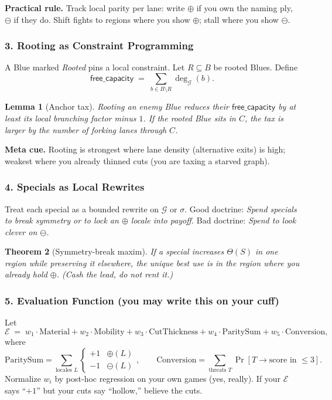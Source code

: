\documentclass[11pt]{article}
\numberwithin{equation}{section} %
\theoremstyle{plain} %
\newtheorem{theorem}{Theorem}[section]
\newtheorem{lemma}[theorem]{Lemma}
\theoremstyle{definition} %
\theoremstyle{remark} %
\begin{document}
\noindent\textbf{Practical rule.} Track local parity per lane: write \(\oplus\) if you own the naming ply, \(\ominus\) if they do. Shift fights to regions where you show \(\oplus\); stall where you show \(\ominus\).

\subsubsection{3. Rooting as Constraint Programming}
\label{ael-core:root}
A Blue marked \emph{Rooted} pins a local constraint. Let \(R\subseteq B\) be rooted Blues. Define
\[
\mathsf{free\_capacity} \;=\; \sum_{b\in B\setminus R}\deg_{\mathcal{G}}(b).
\]

\begin{lemma}[Anchor tax]
Rooting an enemy Blue reduces their \(\mathsf{free\_capacity}\) by at least its local branching factor minus \(1\). If the rooted Blue sits in \(C\), the tax is larger by the number of forking lanes through \(C\).
\end{lemma}

\noindent\textbf{Meta cue.} Rooting is strongest where lane density (alternative exits) is high; weakest where you already thinned cuts (you are taxing a starved graph).

\subsubsection{4. Specials as Local Rewrites}
\label{ael-core:specials}
Treat each special as a bounded rewrite on \(\mathcal{G}\) or \(\sigma\). Good doctrine: \emph{Spend specials to break symmetry or to lock an \(\oplus\) locale into payoff.} Bad doctrine: \emph{Spend to look clever on \(\ominus\).}

\begin{theorem}[Symmetry-break maxim]
If a special increases \(\Theta(S)\) in one region while preserving it elsewhere, the unique best use is in the region where you already hold \(\oplus\). (Cash the lead, do not rent it.)
\end{theorem}

\subsubsection{5. Evaluation Function (you may write this on your cuff)}
Let
\[
\mathcal{E} \;=\; w_1 \cdot \mathrm{Material} + w_2 \cdot \mathrm{Mobility} + w_3 \cdot \mathrm{CutThickness} + w_4 \cdot \mathrm{ParitySum} + w_5 \cdot \mathrm{Conversion},
\]
where
\[
\mathrm{ParitySum}=\sum_{\text{locales }L} \begin{cases}+1 & \oplus(L)\\ -1 & \ominus(L)\end{cases},
\qquad
\mathrm{Conversion}=\sum_{\text{threats }T}\Pr[T\to\text{score in }\leq 3].
\]
Normalize \(w_i\) by post-hoc regression on your own games (yes, really). If your \(\mathcal{E}\) says ``\(+1\)'' but your cuts say ``hollow,'' believe the cuts.
\end{document}
